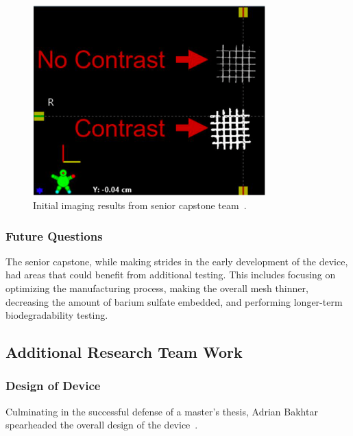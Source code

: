 \begin{figure}[h!]
        \centering
        \includegraphics[width=0.8\textwidth]{../figs/introduction/capstone_imaging_testing.png}
        \caption{Initial imaging results from senior capstone team~\cite{RefWorks:RefID:372-krakovskytumor}.}
        \label{fig:introduction:capstoneImagingTesting}
\end{figure}

\subsubsection{Future Questions\label{sec:introduction:priorWork:seniorCapstone:futureQuestions}}

The senior capstone, while making strides in the early development of the device, had areas that could benefit from additional testing. This includes focusing on optimizing the manufacturing process, making the overall mesh thinner, decreasing the amount of barium sulfate embedded, and performing longer-term biodegradability testing.

\subsection{Additional Research Team Work\label{sec:introduction:priorWork:otherTeamWork}}

\subsubsection{Design of Device\label{sec:introduction:priorWork:otherTeamWork:deviceDesign}}

Culminating in the successful defense of a master's thesis, Adrian Bakhtar spearheaded the overall design of the device~\cite{RefWorks:RefID:371-bakhtardesign}.

